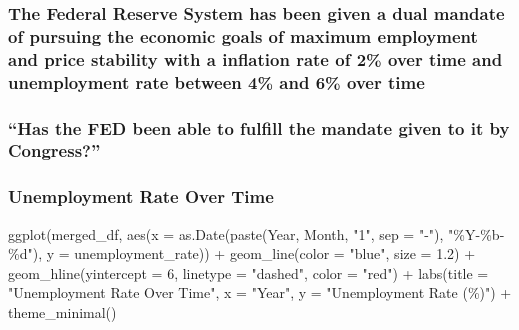 \documentclass[
  letterpaper,
  DIV=11,
  numbers=noendperiod]{scrartcl}
\newenvironment{Shaded}{\begin{snugshade}}{\end{snugshade}}
\newcommand{\AttributeTok}[1]{\textcolor[rgb]{0.40,0.45,0.13}{#1}}
\newcommand{\DecValTok}[1]{\textcolor[rgb]{0.68,0.00,0.00}{#1}}
\newcommand{\FloatTok}[1]{\textcolor[rgb]{0.68,0.00,0.00}{#1}}
\newcommand{\FunctionTok}[1]{\textcolor[rgb]{0.28,0.35,0.67}{#1}}
\newcommand{\NormalTok}[1]{\textcolor[rgb]{0.00,0.23,0.31}{#1}}
\newcommand{\SpecialCharTok}[1]{\textcolor[rgb]{0.37,0.37,0.37}{#1}}
\newcommand{\StringTok}[1]{\textcolor[rgb]{0.13,0.47,0.30}{#1}}
\begin{document}
\subsubsection{The Federal Reserve System has been given a dual mandate
of pursuing the economic goals of maximum employment and price stability
with a inflation rate of 2\% over time and unemployment rate between 4\%
and 6\% over
time}\label{the-federal-reserve-system-has-been-given-a-dual-mandate-of-pursuing-the-economic-goals-of-maximum-employment-and-price-stability-with-a-inflation-rate-of-2-over-time-and-unemployment-rate-between-4-and-6-over-time}

\subsubsection{``Has the FED been able to fulfill the mandate given to
it by
Congress?''}\label{has-the-fed-been-able-to-fulfill-the-mandate-given-to-it-by-congress}

\subsubsection{Unemployment Rate Over
Time}\label{unemployment-rate-over-time}

\begin{Shaded}
\begin{Highlighting}[]
\FunctionTok{ggplot}\NormalTok{(merged\_df, }\FunctionTok{aes}\NormalTok{(}\AttributeTok{x =} \FunctionTok{as.Date}\NormalTok{(}\FunctionTok{paste}\NormalTok{(Year, Month, }\StringTok{"1"}\NormalTok{, }\AttributeTok{sep =} \StringTok{"{-}"}\NormalTok{), }\StringTok{"\%Y{-}\%b{-}\%d"}\NormalTok{), }\AttributeTok{y =}\NormalTok{ unemployment\_rate)) }\SpecialCharTok{+}
  \FunctionTok{geom\_line}\NormalTok{(}\AttributeTok{color =} \StringTok{"blue"}\NormalTok{, }\AttributeTok{size =} \FloatTok{1.2}\NormalTok{) }\SpecialCharTok{+}
  \FunctionTok{geom\_hline}\NormalTok{(}\AttributeTok{yintercept =} \DecValTok{6}\NormalTok{, }\AttributeTok{linetype =} \StringTok{"dashed"}\NormalTok{, }\AttributeTok{color =} \StringTok{"red"}\NormalTok{) }\SpecialCharTok{+}
  \FunctionTok{labs}\NormalTok{(}\AttributeTok{title =} \StringTok{"Unemployment Rate Over Time"}\NormalTok{,}
       \AttributeTok{x =} \StringTok{"Year"}\NormalTok{, }
       \AttributeTok{y =} \StringTok{"Unemployment Rate (\%)"}\NormalTok{) }\SpecialCharTok{+}
  \FunctionTok{theme\_minimal}\NormalTok{()}
\end{Highlighting}
\end{Shaded}
\end{document}

